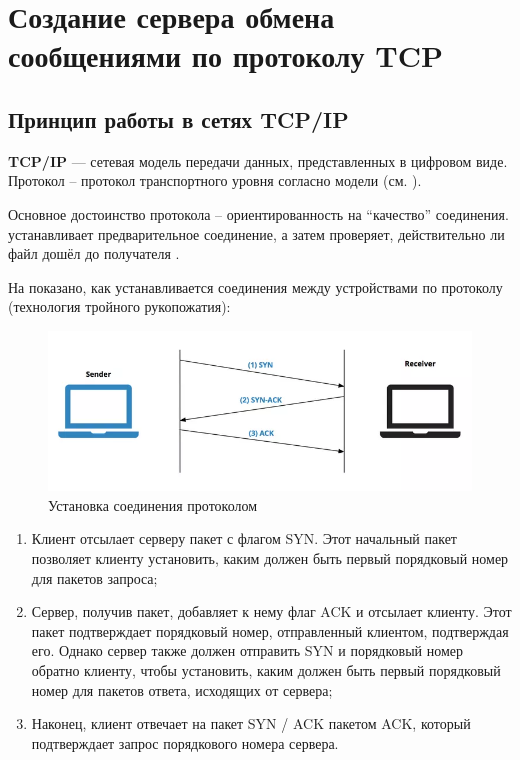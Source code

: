 \documentclass[../AISTR.tex]{subfiles}
\begin{document}
\section{Создание сервера обмена сообщениями по протоколу TCP}
\subsection{Принцип работы в сетях TCP/IP}
\textbf{TCP/IP} — сетевая модель передачи данных, представленных в цифровом виде. Протокол \tcp -- протокол транспортного уровня согласно модели \osi (см. ).

Основное достоинство протокола -- ориентированность на ``качество'' соединения. \tcp устанавливает предварительное соединение, а затем проверяет, действительно ли файл дошёл до получателя \cite{kumar_survey_2012}. 

На  показано, как устанавливается соединения между устройствами по протоколу \tcp (технология тройного рукопожатия):
\begin{figure}[h]
	\centering
	\includegraphics[width=0.8\linewidth]{../images/handshake}
	\caption{Установка соединения протоколом \tcp}
	\label{fig:handshake}
\end{figure}
\begin{enumerate}
	\item Клиент отсылает серверу пакет с флагом SYN. Этот начальный пакет позволяет клиенту установить, каким должен быть первый порядковый номер для пакетов запроса;
	\item Сервер, получив пакет, добавляет к нему флаг ACK и отсылает клиенту. Этот пакет подтверждает порядковый номер, отправленный клиентом, подтверждая его. Однако сервер также должен отправить SYN и порядковый номер обратно клиенту, чтобы установить, каким должен быть первый порядковый номер для пакетов ответа, исходящих от сервера;
	\item Наконец, клиент отвечает на пакет SYN / ACK пакетом ACK, который подтверждает запрос порядкового номера сервера.
\end{enumerate}
\end{document}
